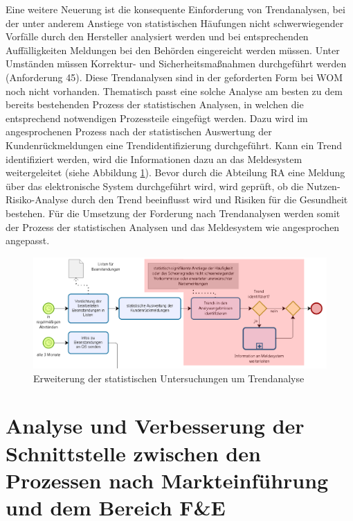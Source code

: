 \documentclass[a4paper,12pt]{report}
\begin{document}
Eine weitere Neuerung ist die konsequente Einforderung von Trendanalysen, bei der unter anderem Anstiege von statistischen Häufungen nicht schwerwiegender Vorfälle durch den Hersteller analysiert werden und bei entsprechenden Auffälligkeiten Meldungen bei den Behörden eingereicht werden müssen. Unter Umständen müssen Korrektur- und Sicherheitsmaßnahmen durchgeführt werden (Anforderung 45). Diese Trendanalysen sind in der geforderten Form bei WOM noch nicht vorhanden. Thematisch passt eine solche Analyse am besten zu dem bereits bestehenden Prozess der statistischen Analysen, in welchen die entsprechend notwendigen Prozessteile eingefügt werden. Dazu wird im angesprochenen Prozess nach der statistischen Auswertung der Kundenrückmeldungen eine Trendidentifizierung durchgeführt. Kann ein Trend identifiziert werden, wird die Informationen dazu an das Meldesystem weitergeleitet (siehe Abbildung \ref{statistic_trend_analysis}). Bevor durch die Abteilung RA eine Meldung über das elektronische System durchgeführt wird, wird geprüft, ob die Nutzen-Risiko-Analyse durch den Trend beeinflusst wird und Risiken für die Gesundheit bestehen. Für die Umsetzung der Forderung nach Trendanalysen werden somit der Prozess der statistischen Analysen und das Meldesystem wie angesprochen angepasst.
\begin{figure}[ht]
\centering
\includegraphics[width=1\textwidth]{Images/statistic_trend_analysis}
\caption[Erweiterung der statistischen Untersuchungen um Trendanalyse]{Erweiterung der statistischen Untersuchungen um Trendanalyse}
\label{statistic_trend_analysis}
\end{figure}
\chapter{Analyse und Verbesserung der Schnittstelle zwischen den Prozessen nach Markteinführung und dem Bereich F\&E}\label{chap:Schnittstelle}

\end{document}
